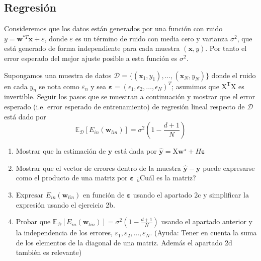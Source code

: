 \documentclass[11pt,leqno]{article}
\theoremstyle{definition}
\begin{document}
\subsection{Regresión}
\begin{cuestion}
Consideremos que los datos están generados por una función con ruido $y= \mathbf{w}^{*T}\mathbf{x} + \varepsilon$, donde $\varepsilon$ es un término de ruido con media cero y varianza $\sigma^2$, que está generado de forma independiente para cada muestra $(\mathbf{x}, y)$. Por tanto el error esperado del mejor ajuste posible a esta función es $\sigma^2$.
    
    Supongamos una muestra de datos $\mathcal{D} = \{ (\mathbf{x}_1,y_1), \dots, (\mathbf{x}_N,y_N)\}$ donde  el ruido en cada $y_n$ se nota como $\varepsilon_n$ y sea $\mathbf{\varepsilon} = (\epsilon_1,\epsilon_2, \dots,\epsilon_N)^T$; asumimos que $\mathrm{X^TX}$ es invertible. Seguir los pasos que se muestran a continuación y mostrar que el error esperado (i.e. error esperado de entrenamiento) de regresión lineal respecto de $\mathcal{D}$  está dado por
    \[
    \mathbb{E}_{\mathcal{D}} [E_{in}(\mathbf{w}_{lin})] =
    	\sigma^2 \left( 1 - \frac{d+1}{N} \right)
    \]
    \begin{enumerate}[a]
        \item Mostrar que la estimación de $\mathbf{y}$ está dada por $\mathbf{\hat{y}} = \mathrm{X}\mathbf{w^\star} + H \mathbf{\varepsilon}$
        \item Mostrar que el vector de errores dentro de la muestra $\mathbf{\hat{y}}-\mathbf{y}$ puede expresarse como el producto de una matriz por $\mathbf{\varepsilon}$ ¿Cuál es la matriz?
        
        \item Expresar $E_{in}(\mathbf{w}_{lin})$ en función de $\mathbf{\varepsilon}$  usando el apartado 2c y simplificar la expresión usando el ejercicio 2b.
        
        \item Probar que $\mathbb{E}_\mathcal{D} [E_{in}(\mathbf{w}_{lin})] = \sigma^2 \left( 1 - \frac{d+1}{N} \right)$ usando el apartado anterior y la independencia de los errores, $\varepsilon_1,\varepsilon_2, \dots, \varepsilon_N$. (Ayuda: Tener en cuenta la suma de los elementos de la diagonal de una matriz. Además el apartado 2d también es relevante)
        

\end{enumerate}
\end{cuestion}
\end{document}
